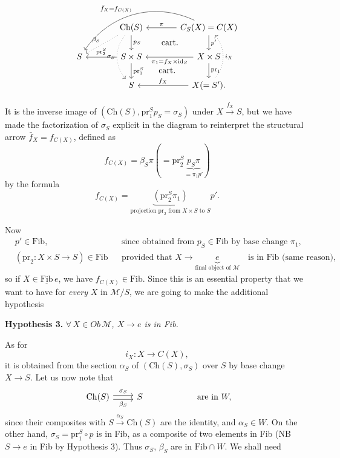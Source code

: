 \documentclass[11pt]{article}
\newcommand{\printedpage}[1]{\marginpar{\footnotesize p.~#1}}
\newcommand{\msp}[1]{\marginpar{\footnotesize [#1]}}
\newcommand{\Fib}{\underline{\mathrm{Fib}}}
\newcommand{\Ch}{\mathrm{Ch}}
\newcommand{\pr}{\mathrm{pr}}
\begin{document}
\printedpage{64}

\[
\begin{tikzcd}[column sep=large]
 & \Ch(S) \arrow[d, "p_S"] \arrow[dl, dotted, "\beta_S"'] \arrow[dd, dotted, bend right=40, "\sigma_S"'] \arrow[dr, phantom, "\text{cart.}"]
 & C_S(X)=C(X) \arrow[l, "\pi"'] \arrow[d, "p'"] \arrow[dll, bend right=40, "\bar f_X=f_{C(X)}"'] \\
S & S\times S \arrow[l, "\pr_2^S"'] \arrow[d, "\pr_1^S"] \arrow[dr, phantom, "\text{cart.}"]
 & X\times S \arrow[l, "\pi_1=f_X\times\mathrm{id}_S"] \arrow[d, "\pr_1"] \\
 & S & X(=S'). \arrow[l, "f_X"'] \arrow[uu, dotted, bend right=40, "i_X"']
\end{tikzcd}
\]

It is the inverse image of $(\Ch(S),\pr_1^Sp_S=\sigma_S)$ under $X\xrightarrow{f_X}S$, but we have made the factorization of $\sigma_S$ explicit in the diagram to reinterpret the structural arrow $\bar f_X=f_{C(X)}$, defined as
\[
f_{C(X)}=\beta_S\pi(=\pr_2^S\underbrace{p_S\pi}_{=\pi_1p'})
\]
by the formula
\[
f_{C(X)}=\underbrace{(\pr_2^S\pi_1)}_{\text{projection } \pr_2 \text{ from } X\times S \text{ to } S}p'.
\]

\msp{page 102}
Now
\[
\begin{aligned}
&p'\in\mathrm{Fib}, && \text{since obtained from } p_S\in\mathrm{Fib} \text{ by base change } \pi_1,\\
&(\pr_2 : X\times S\longrightarrow S)\in\mathrm{Fib} && \text{provided that } X\longrightarrow\underbrace{e}_{\text{final object of } \mathcal{M}}\quad \text{is in Fib (same reason),}
\end{aligned}
\]
so if $X\in\Fib\,e$, we have $f_{C(X)}\in\mathrm{Fib}$. Since this is an essential property that we want to have for \textit{every} $X$ in $\mathcal{M}/S$, we are going to make the additional hypothesis

\textbf{Hypothesis 3.} \textit{$\forall\,X\in\mathit{Ob}\,\mathcal{M}$, $X\longrightarrow e$ is in Fib.}

As for
\[
i_X : X\longrightarrow C(X),
\]
it is obtained from the section $\alpha_S$ of $(\Ch(S),\sigma_S)$ over $S$ by base change $X\longrightarrow S$. Let us now note that
\[
\begin{tikzcd}
\Ch(S) \arrow[r, shift left, "\sigma_S"] \arrow[r, shift right, "\beta_S"'] & S
\end{tikzcd}
\qquad\qquad\qquad \text{are in } W,
\]
since their composites with $S\xrightarrow{\alpha_S}\Ch(S)$ are the identity, and $\alpha_S\in W$. On the other hand, $\sigma_S=\pr_1^S\circ p$ is in Fib, as a composite of two elements in Fib (NB $S\longrightarrow e$ in Fib by Hypothesis 3). Thus $\sigma_S$, $\beta_S$ are in $\mathrm{Fib}\cap W$. We shall need %
\end{document}
